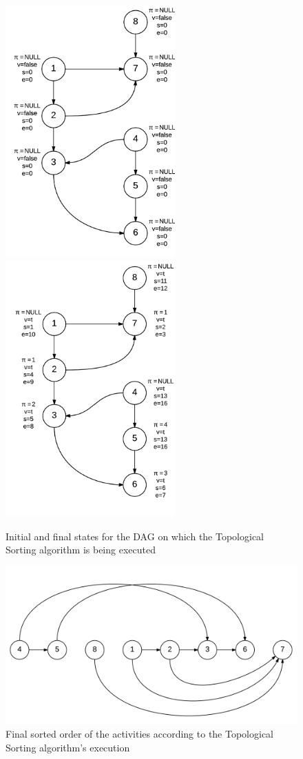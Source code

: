 \documentclass[12pt,letterpaper]{article}
\begin{document}
\begin{figure}
\centering
\includegraphics[width=6.5cm]{topo0}
\includegraphics[width=6.5cm]{topofin}
\caption{Initial and final states for the DAG on which the Topological Sorting algorithm is being executed}
\end{figure}
\begin{figure}
\centering
\includegraphics[width=12cm]{TopoSort}
\caption{Final sorted order of the activities according to the Topological Sorting algorithm's execution}
\end{figure}
\FloatBarrier
\end{document}
